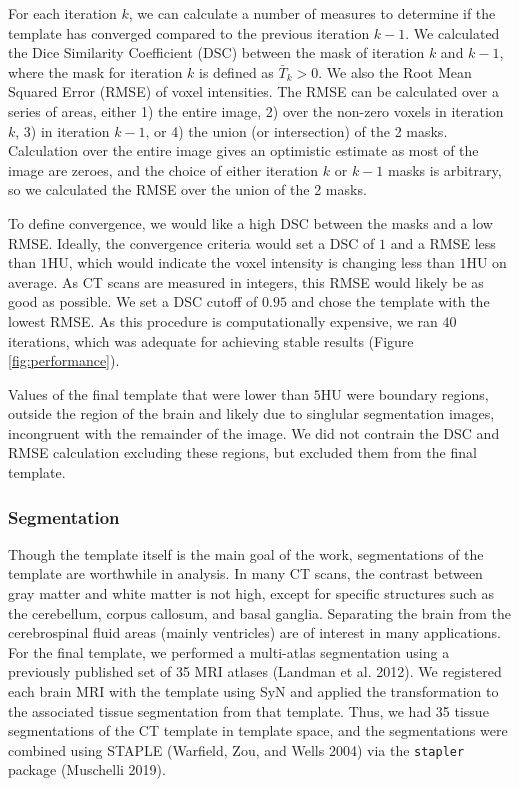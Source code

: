 \documentclass[]{elsarticle} %
\begin{document}
For each iteration \(k\), we can calculate a number of measures to determine if the template has converged compared to the previous iteration \(k - 1\). We calculated the Dice Similarity Coefficient (DSC) between the mask of iteration \(k\) and \(k-1\), where the mask for iteration \(k\) is defined as \(\bar{T}_{k} > 0\). We also the Root Mean Squared Error (RMSE) of voxel intensities. The RMSE can be calculated over a series of areas, either 1) the entire image, 2) over the non-zero voxels in iteration \(k\), 3) in iteration \(k-1\), or 4) the union (or intersection) of the 2 masks. Calculation over the entire image gives an optimistic estimate as most of the image are zeroes, and the choice of either iteration \(k\) or \(k-1\) masks is arbitrary, so we calculated the RMSE over the union of the 2 masks.

To define convergence, we would like a high DSC between the masks and a low RMSE. Ideally, the convergence criteria would set a DSC of \(1\) and a RMSE less than \(1\)HU, which would indicate the voxel intensity is changing less than \(1\)HU on average. As CT scans are measured in integers, this RMSE would likely be as good as possible. We set a DSC cutoff of \(0.95\) and chose the template with the lowest RMSE. As this procedure is computationally expensive, we ran \(40\) iterations, which was adequate for achieving stable results (Figure \ref{fig:performance}).

Values of the final template that were lower than \(5\)HU were boundary regions, outside the region of the brain and likely due to singlular segmentation images, incongruent with the remainder of the image. We did not contrain the DSC and RMSE calculation excluding these regions, but excluded them from the final template.

\hypertarget{segmentation}{%
\subsubsection{Segmentation}\label{segmentation}}

Though the template itself is the main goal of the work, segmentations of the template are worthwhile in analysis. In many CT scans, the contrast between gray matter and white matter is not high, except for specific structures such as the cerebellum, corpus callosum, and basal ganglia. Separating the brain from the cerebrospinal fluid areas (mainly ventricles) are of interest in many applications. For the final template, we performed a multi-atlas segmentation using a previously published set of 35 MRI atlases (Landman et al. 2012). We registered each brain MRI with the template using SyN and applied the transformation to the associated tissue segmentation from that template. Thus, we had 35 tissue segmentations of the CT template in template space, and the segmentations were combined using STAPLE (Warfield, Zou, and Wells 2004) via the \texttt{stapler} package (Muschelli 2019).
\end{document}
